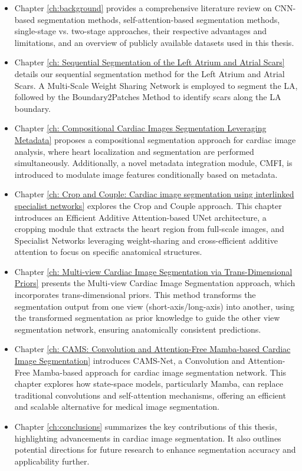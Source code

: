 \begin{itemize}
    \item Chapter \ref{ch:background} provides a comprehensive literature review on CNN-based segmentation methods, self-attention-based segmentation methods, single-stage vs. two-stage approaches, their respective advantages and limitations, and an overview of publicly available datasets used in this thesis.
    \item Chapter \ref{ch: Sequential Segmentation of the Left Atrium and Atrial Scars} details our sequential segmentation method for the Left Atrium and Atrial Scars. A Multi-Scale Weight Sharing Network is employed to segment the LA, followed by the Boundary2Patches Method to identify scars along the LA boundary.
    \item Chapter \ref{ch: Compositional Cardiac Images Segmentation Leveraging Metadata} proposes a compositional segmentation approach for cardiac image analysis, where heart localization and segmentation are performed simultaneously. Additionally, a novel metadata integration module, CMFI, is introduced to modulate image features conditionally based on metadata.
    \item Chapter \ref{ch: Crop and Couple: Cardiac image segmentation using interlinked specialist networks} explores the Crop and Couple approach. This chapter introduces an Efficient Additive Attention-based UNet architecture, a cropping module that extracts the heart region from full-scale images, and Specialist Networks leveraging weight-sharing and cross-efficient additive attention to focus on specific anatomical structures.
    \item Chapter \ref{ch: Multi-view Cardiac Image Segmentation via Trans-Dimensional Priors} presents the Multi-view Cardiac Image Segmentation approach, which incorporates trans-dimensional priors. This method transforms the segmentation output from one view (short-axis/long-axis) into another, using the transformed segmentation as prior knowledge to guide the other view segmentation network, ensuring anatomically consistent predictions.
    \item Chapter \ref{ch: CAMS: Convolution and Attention-Free Mamba-based Cardiac Image Segmentation} introduces CAMS-Net, a Convolution and Attention-Free Mamba-based approach for cardiac image segmentation network. This chapter explores how state-space models, particularly Mamba, can replace traditional convolutions and self-attention mechanisms, offering an efficient and scalable alternative for medical image segmentation. 
    \item Chapter \ref{ch:conclusions} summarizes the key contributions of this thesis, highlighting advancements in cardiac image segmentation. It also outlines potential directions for future research to enhance segmentation accuracy and applicability further.
    
    
\end{itemize}



